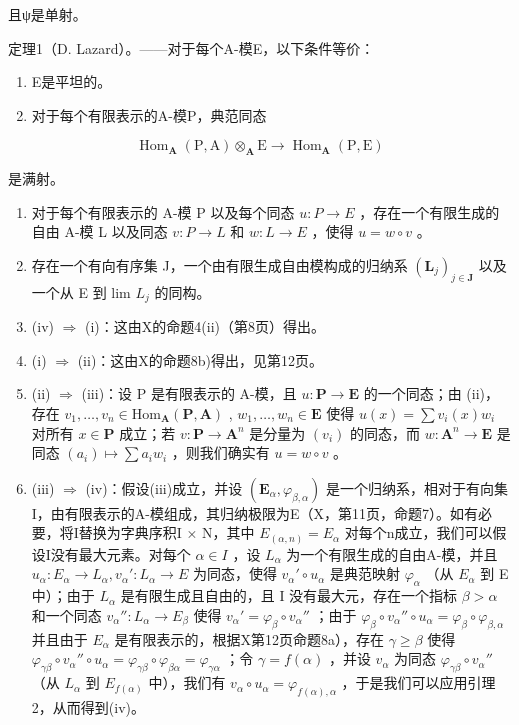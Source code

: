 且ψ是单射。

定理1（D. Lazard）。——对于每个A-模E，以下条件等价：

\begin{enumerate}
\def\labelenumi{(\roman{enumi})}
\item
  E是平坦的。
\item
  对于每个有限表示的A-模P，典范同态
\end{enumerate}

\[
\operatorname{Hom} _ {\mathbf {A}} (\mathrm{P}, \mathrm{A}) \otimes_ {\mathbf {A}} \mathrm{E} \rightarrow \operatorname{Hom} _ {\mathbf {A}} (\mathrm{P}, \mathrm{E})
\]

是满射。

\begin{enumerate}
\def\labelenumi{(\roman{enumi})}
\setcounter{enumi}{2}
\item
  对于每个有限表示的 A-模 P 以及每个同态 \(u : P \to E\) ，存在一个有限生成的自由 A-模 L 以及同态 \(v : P \to L\) 和 \(w : L \to E\) ，使得 \(u = w \circ v\) 。
\item
  存在一个有向有序集 J，一个由有限生成自由模构成的归纳系 \((\mathbf{L}_{j})_{j\in\mathbf{J}}\) 以及一个从 E 到 lim \(L_{j}\) 的同构。
\item
  (iv) \(\Rightarrow\) (i)：这由X的命题4(ii)（第8页）得出。
\item
  (i) \(\Rightarrow\) (ii)：这由X的命题8b)得出，见第12页。
\item
  (ii) \(\Rightarrow\) (iii)：设 P 是有限表示的 A-模，且 \(u: \mathbf{P} \to \mathbf{E}\) 的一个同态；由 (ii)，存在 \(v_1, \ldots, v_n \in \mathrm{Hom}_{\mathbf{A}}(\mathbf{P}, \mathbf{A})\) , \(w_1, \ldots, w_n \in \mathbf{E}\) 使得 \(u(x) = \sum v_i(x) w_i\) 对所有 \(x \in \mathbf{P}\) 成立；若 \(v: \mathbf{P} \to \mathbf{A}^n\) 是分量为 \((v_i)\) 的同态，而 \(w: \mathbf{A}^n \to \mathbf{E}\) 是同态 \((a_i) \mapsto \sum a_i w_i\) ，则我们确实有 \(u = w \circ v\) 。
\item
  (iii) \(\Rightarrow\) (iv)：假设(iii)成立，并设 \((\mathbf{E}_{\alpha},\varphi_{\beta ,\alpha})\) 是一个归纳系，相对于有向集I，由有限表示的A-模组成，其归纳极限为E（X，第11页，命题7）。如有必要，将I替换为字典序积I × N，其中 \(E_{(\alpha,n)} = E_{\alpha}\) 对每个n成立，我们可以假设I没有最大元素。对每个 \(\alpha \in I\) ，设 \(L_{\alpha}\) 为一个有限生成的自由A-模，并且 \(u_{\alpha}: E_{\alpha} \to L_{\alpha}, v_{\alpha}': L_{\alpha} \to E\) 为同态，使得 \(v_{\alpha}' \circ u_{\alpha}\) 是典范映射 \(\varphi_{\alpha}\) （从 \(E_{\alpha}\) 到 E 中）；由于 \(L_{\alpha}\) 是有限生成且自由的，且 I 没有最大元，存在一个指标 \(\beta > \alpha\) 和一个同态 \(v_{\alpha}'': L_{\alpha} \to E_{\beta}\) 使得 \(v_{\alpha}' = \varphi_{\beta} \circ v_{\alpha}''\) ；由于 \(\varphi_{\beta} \circ v_{\alpha}'' \circ u_{\alpha} = \varphi_{\beta} \circ \varphi_{\beta,\alpha}\) 并且由于 \(E_{\alpha}\) 是有限表示的，根据X第12页命题8a），存在 \(\gamma \geqslant \beta\) 使得 \(\varphi_{\gamma\beta} \circ v_{\alpha}'' \circ u_{\alpha} = \varphi_{\gamma\beta} \circ \varphi_{\beta\alpha} = \varphi_{\gamma\alpha}\) ；令 \(\gamma = f(\alpha)\) ，并设 \(v_{\alpha}\) 为同态 \(\varphi_{\gamma\beta} \circ v_{\alpha}''\) （从 \(L_{\alpha}\) 到 \(E_{f(\alpha)}\) 中），我们有 \(v_{\alpha} \circ u_{\alpha} = \varphi_{f(\alpha),\alpha}\) ，于是我们可以应用引理2，从而得到(iv)。

\end{enumerate}
